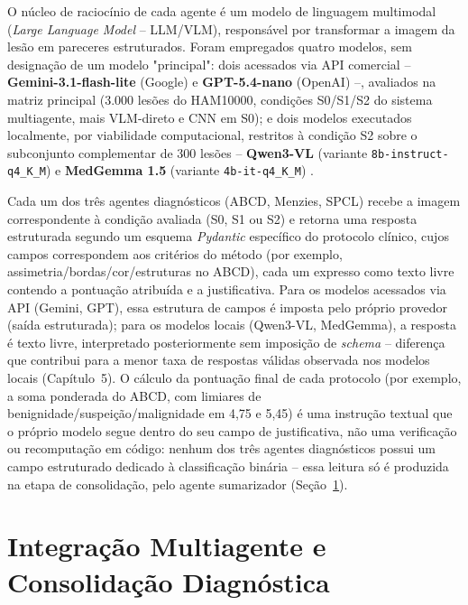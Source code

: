 O núcleo de raciocínio de cada agente é um modelo de linguagem multimodal (\textit{Large Language Model} -- LLM/VLM), responsável por transformar a imagem da lesão em pareceres estruturados. Foram empregados quatro modelos, sem designação de um modelo "principal": dois acessados via API comercial -- \textbf{Gemini-3.1-flash-lite} \cite{google2025gemini31} (Google) e \textbf{GPT-5.4-nano} \cite{openai2025gpt5nano} (OpenAI) --, avaliados na matriz principal (3.000 lesões do HAM10000, condições S0/S1/S2 do sistema multiagente, mais VLM-direto e CNN em S0); e dois modelos executados localmente, por viabilidade computacional, restritos à condição S2 sobre o subconjunto complementar de 300 lesões -- \textbf{Qwen3-VL} (variante \texttt{8b-instruct-q4\_K\_M}) \cite{qwen2025qwen3vl} e \textbf{MedGemma 1.5} (variante \texttt{4b-it-q4\_K\_M}) \cite{google2025medgemma}.

Cada um dos três agentes diagnósticos (ABCD, Menzies, SPCL) recebe a imagem correspondente à condição avaliada (S0, S1 ou S2) e retorna uma resposta estruturada segundo um esquema \textit{Pydantic} específico do protocolo clínico, cujos campos correspondem aos critérios do método (por exemplo, assimetria/bordas/cor/estruturas no ABCD), cada um expresso como texto livre contendo a pontuação atribuída e a justificativa. Para os modelos acessados via API (Gemini, GPT), essa estrutura de campos é imposta pelo próprio provedor (saída estruturada); para os modelos locais (Qwen3-VL, MedGemma), a resposta é texto livre, interpretado posteriormente sem imposição de \textit{schema} -- diferença que contribui para a menor taxa de respostas válidas observada nos modelos locais (Capítulo~5). O cálculo da pontuação final de cada protocolo (por exemplo, a soma ponderada do ABCD, com limiares de benignidade/suspeição/malignidade em 4,75 e 5,45) é uma instrução textual que o próprio modelo segue dentro do seu campo de justificativa, não uma verificação ou recomputação em código: nenhum dos três agentes diagnósticos possui um campo estruturado dedicado à classificação binária -- essa leitura só é produzida na etapa de consolidação, pelo agente sumarizador (Seção~\ref{sec:multiagente}).

\section{Integração Multiagente e Consolidação Diagnóstica}
\label{sec:multiagente}

